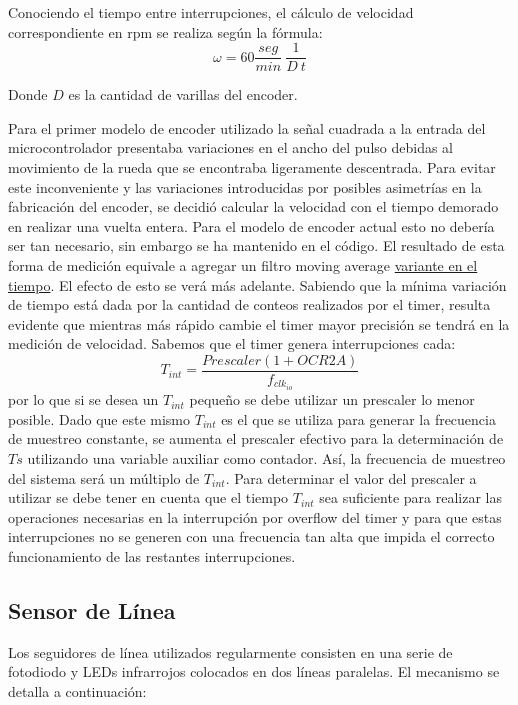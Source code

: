 \documentclass[10pt,conference,a4paper,onecolumn]{article}%
\begin{document}
Conociendo el tiempo entre interrupciones, el cálculo de velocidad correspondiente en rpm se realiza según la fórmula:
\begin{equation*}
\omega=60 \frac{seg}{min}\ \frac{1}{D\ t}
\end{equation*}

Donde $D$ es la cantidad de varillas del encoder. 

Para el primer modelo de encoder utilizado la señal cuadrada a la entrada del microcontrolador presentaba variaciones en el ancho del pulso debidas al movimiento de la rueda que se encontraba ligeramente descentrada. Para evitar este inconveniente y las variaciones introducidas por posibles asimetrías en la fabricación del encoder,
se decidió calcular la velocidad con el tiempo demorado en realizar una vuelta entera. Para el modelo de encoder actual esto no debería ser tan necesario, sin embargo se ha mantenido en el código. El resultado de esta forma de medición equivale a agregar un filtro moving average \underline{ variante en el tiempo}. El efecto de esto se verá más
adelante.
Sabiendo que la mínima variación de tiempo está dada por la cantidad de conteos realizados por el timer, resulta evidente que mientras más rápido cambie el timer mayor precisión se tendrá en la medición de velocidad.
Sabemos que el timer genera interrupciones cada:
\begin{equation}
T_{int}=\frac{Prescaler(1+OCR2A)}{f_{clk_{io}}}
\end{equation}
por lo que si se desea un $T_{int}$ pequeño se debe utilizar un prescaler lo menor posible. Dado que este mismo $T_{int}$ es el que se utiliza para generar la frecuencia de muestreo constante, se aumenta el prescaler efectivo para la determinación de $Ts$ utilizando una variable auxiliar como contador. Así, la frecuencia de muestreo del sistema será un múltiplo de $T_{int}$. Para determinar el valor del prescaler a utilizar se debe tener en cuenta que el tiempo $T_{int}$ sea suficiente para realizar las operaciones necesarias en la interrupción por overflow del timer y para que estas interrupciones no se generen con una frecuencia tan alta que impida el correcto funcionamiento de las restantes interrupciones.

\subsection{Sensor de Línea}
Los seguidores de línea utilizados regularmente consisten en una serie de fotodiodo y LEDs infrarrojos colocados en dos líneas paralelas. El mecanismo se detalla a continuación:
\end{document}

